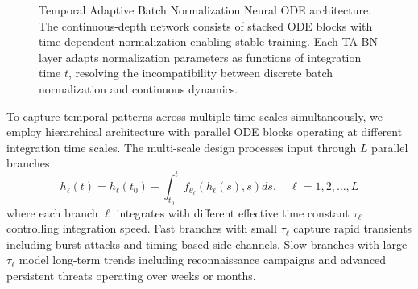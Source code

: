 \documentclass[10pt,journal,compsoc]{IEEEtran}
\begin{document}
\begin{figure}[!t]
\centering
{}
\caption{Temporal Adaptive Batch Normalization Neural ODE architecture. The continuous-depth network consists of stacked ODE blocks with time-dependent normalization enabling stable training. Each TA-BN layer adapts normalization parameters as functions of integration time $t$, resolving the incompatibility between discrete batch normalization and continuous dynamics.}
\label{fig:tabn_architecture}
\end{figure}

To capture temporal patterns across multiple time scales simultaneously, we employ hierarchical architecture with parallel ODE blocks operating at different integration time scales. The multi-scale design processes input through $L$ parallel branches
\begin{equation}
h_\ell(t) = h_\ell(t_0) + \int_{t_0}^{t} f_{\theta_\ell}(h_\ell(s), s) ds, \quad \ell = 1, 2, \ldots, L
\end{equation}
where each branch $\ell$ integrates with different effective time constant $\tau_\ell$ controlling integration speed. Fast branches with small $\tau_\ell$ capture rapid transients including burst attacks and timing-based side channels. Slow branches with large $\tau_\ell$ model long-term trends including reconnaissance campaigns and advanced persistent threats operating over weeks or months.
\end{document}
